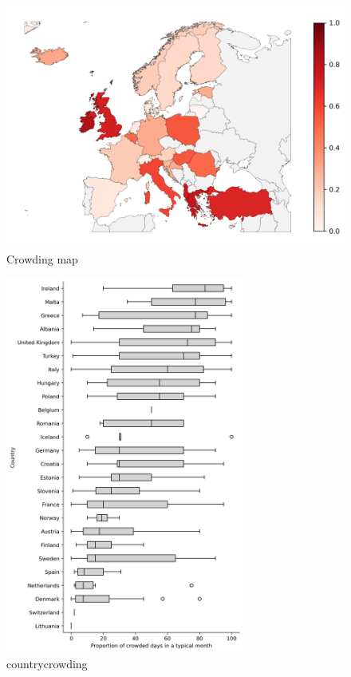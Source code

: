 \documentclass{article}
\begin{document}
\begin{figure}[H]
    \centering
        \includegraphics[width=1.0\textwidth]{../output/plots/crowding_map}
        \caption{Crowding map}
        \label{fig:crowding_map}
\end{figure}

\begin{figure}[H]
    \centering
        \includegraphics[width=0.7\textwidth]{../output/plots/country_crowding}
        \caption{countrycrowding}
        \label{fig:country_crowding}
\end{figure}
\end{document}
